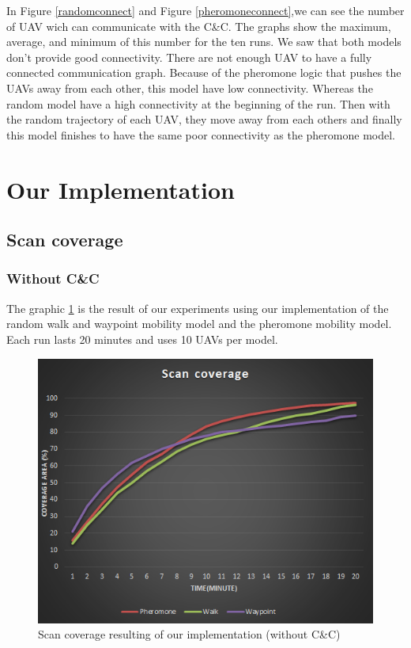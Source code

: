 In Figure \ref{randomconnect} and Figure \ref{pheromoneconnect},we can see the number of UAV wich can communicate with the C\&C.  The  graphs  show the maximum, average, and minimum of this number for the ten runs. We saw that both models don't provide good connectivity. There are not enough UAV to have a fully connected communication graph. Because of the pheromone logic that pushes the UAVs away from each other, this model have low connectivity. Whereas the random model have a high connectivity at the beginning of the run. Then with the random trajectory of each UAV, they move away from each others and finally this model finishes to have the same poor connectivity as the pheromone model.

\section{Our Implementation}

\subsection{Scan coverage}

\subsubsection{Without C\&C}

The graphic \ref{scancoverage} is the result of our experiments using our implementation of the random walk and waypoint mobility model and the pheromone mobility model. Each run lasts 20 minutes and uses 10 UAVs per model.

\newpage

\begin{figure}[!hbtf]
\centering
   \includegraphics{../images/ScanCoverageResult.png}
\caption{\label{scancoverage} Scan coverage resulting of our implementation (without C\&C)}
\end{figure}

